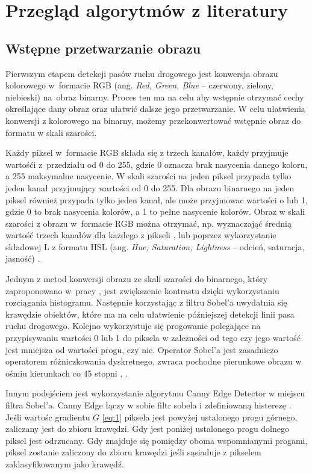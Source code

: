 \chapter{Przegląd algorytmów z literatury}

\section{Wstępne przetwarzanie obrazu}
Pierwszym etapem detekcji pasów ruchu drogowego jest konwersja obrazu kolorowego w~formacie RGB (ang. \textit{Red, Green, Blue} -- czerwony, zielony, niebieski) na~obraz binarny.
Proces ten ma na celu aby wstępnie otrzymać cechy określające dany obraz oraz ułatwić dalsze jego przetwarzanie. W celu ułatwienia konwersji z kolorowego na binarny, możemy przekonwertować wstępnie obraz do formatu w skali szarości. 

Każdy piksel w~formacie RGB składa się z trzech kanałów, każdy przyjmuje wartośći z~przedziału od 0 do 255, gdzie 0 oznacza brak nasycenia danego koloru, a 255 maksymalne nasycenie.
W skali szarości na jeden piksel przypada tylko jeden kanał przyjmujący wartości od 0 do 255.
Dla obrazu binarnego na jeden piksel również przypada tylko jeden kanał, ale może przyjmowac wartości o lub 1, gdzie 0 to brak nasycenia kolorów, a 1 to pełne nasycenie kolorów.
Obraz w skali szarości z obrazu w~formacie RGB można otrzymać, np. wyznaczająć średnią wartość trzech kanałów dla każdego z pikseli \cite{4}, lub poprzez wykorzystanie składowej L z formatu HSL (ang. \textit{Hue, Saturation, Lightness} -- odcień, saturacja, jasność) \cite{reichenbach_comparison}.


Jednym z metod konwersji obrazu ze skali szarości do binarnego, który zaproponowano w~pracy \cite{4}, jest zwiększenie kontrastu dzięki wykorzystaniu rozciągania histogramu. Następnie korzystając z filtru Sobel'a uwydatnia się krawędzie obiektów, które ma na celu ułatwienie późniejszej detekcji linii pasa ruchu drogowego. Kolejno wykorzystuje się progowanie polegające na przypisywaniu wartości 0 lub 1 do piksela w zależności od tego czy jego wartość jest mniejsza od wartości progu, czy nie. Operator Sobel'a jest zasadniczo operatorem różniczkowania dyskretnego, zwraca pochodne pierunkowe obrazu w ośmiu kierunkach co 45 stopni \cite{3}, \cite{sobel}.


Innym podejściem \cite{reichenbach_comparison} jest wykorzystanie algorytmu Canny Edge Detector w miejscu filtra Sobel'a. Canny Edge łączy w sobie filtr sobela i zdefiniowaną histerezę \cite{cany}. Jeśli wartośc gradientu $G$ \eqref{eq:1} piksela jest powyżej ustalonego progu górnego, zaliczany jest do zbioru krawędzi. Gdy jest poniżej ustalonego progu dolnego piksel jest odrzucany. Gdy znajduje się pomiędzy oboma wspomnianymi progami, piksel zostanie zaliczony do zbioru krawędzi jeśli sąsiaduje z pikselem zaklasyfikowanym jako krawędź.


